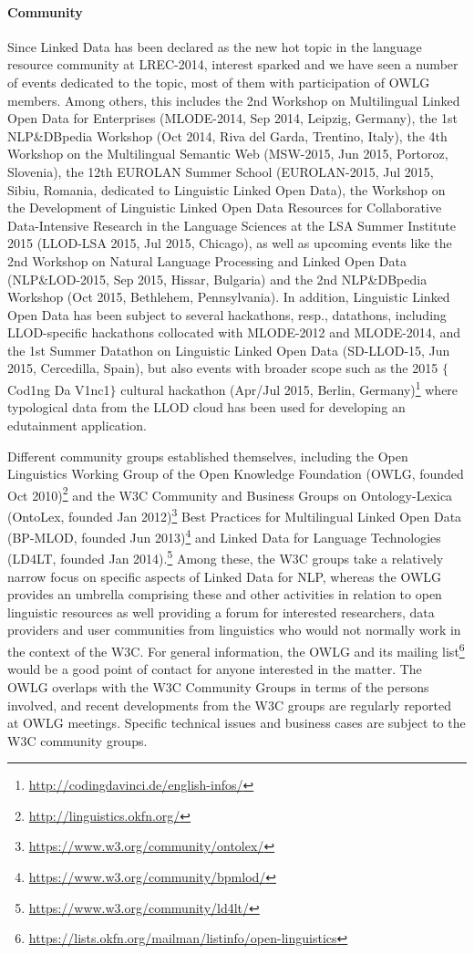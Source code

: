 \paragraph{Community}
Since Linked Data has been declared as the new hot topic in the language resource community at LREC-2014, interest sparked and we have seen a number of events dedicated to the topic, most of them with participation of OWLG members. 
Among others, this includes 
the 2nd Workshop on Multilingual Linked Open Data for Enterprises (MLODE-2014, Sep 2014, Leipzig, Germany), 
the 1st NLP\&DBpedia Workshop (Oct 2014, Riva del Garda, Trentino, Italy), 
the 4th Workshop on the Multilingual Semantic Web (MSW-2015, Jun 2015, Portoroz, Slovenia),
the 12th EUROLAN Summer School (EUROLAN-2015, Jul 2015, Sibiu, Romania, dedicated to Linguistic Linked Open Data),
the Workshop on the Development of Linguistic Linked Open Data Resources for Collaborative Data-Intensive Research in the Language Sciences at the LSA Summer Institute 2015 (LLOD-LSA 2015, Jul 2015, Chicago),
as well as upcoming events like 
the 2nd Workshop on Natural Language Processing and Linked Open Data (NLP\&LOD-2015, Sep 2015, Hissar, Bulgaria) and 
the 2nd NLP\&DBpedia Workshop (Oct 2015, Bethlehem, Pennsylvania).
In addition, Linguistic Linked Open Data has been subject to several hackathons, resp., datathons,
including LLOD-specific hackathons collocated with MLODE-2012 and MLODE-2014, and the 1st Summer Datathon on Linguistic Linked Open Data (SD-LLOD-15, Jun 2015, Cercedilla, Spain), 
but also events with broader scope such as the 2015 $\{$Cod1ng Da V1nc1$\}$ cultural hackathon (Apr/Jul 2015, Berlin, Germany)\footnote{
	\url{http://codingdavinci.de/english-infos/}
}
where typological data from the LLOD cloud has been used for developing an edutainment application.

Different community groups established themselves, including the 
Open Linguistics Working Group of the Open Knowledge Foundation (OWLG, founded Oct 2010)\footnote{
	\url{http://linguistics.okfn.org/}
}
and the W3C Community and Business Groups on Ontology-Lexica (OntoLex, founded Jan 2012)\footnote{
	\url{https://www.w3.org/community/ontolex/}
}
Best Practices for Multilingual Linked Open Data (BP-MLOD, founded Jun 2013)\footnote{
	\url{https://www.w3.org/community/bpmlod/}
} and Linked Data for Language Technologies (LD4LT, founded Jan 2014).\footnote{
	\url{https://www.w3.org/community/ld4lt/}
}
Among these, the W3C groups take a relatively narrow focus on specific aspects of Linked Data for NLP, whereas the OWLG provides an umbrella comprising these and other activities in relation to open linguistic resources as well providing a forum for interested researchers, data providers and user communities from linguistics who would not normally work in the context of the W3C. 
For general information, the OWLG and its mailing list\footnote{
	\url{https://lists.okfn.org/mailman/listinfo/open-linguistics}
} would be a good point of contact for anyone interested in the matter. 
The OWLG overlaps with the W3C Community Groups in terms of the persons involved, and recent developments from the W3C groups are regularly reported at OWLG meetings.
Specific technical issues and business cases are subject to the W3C community groups.

